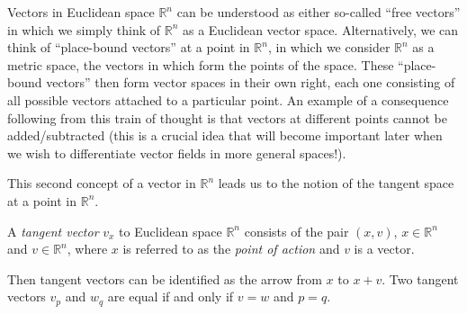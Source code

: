 \noindent Vectors in Euclidean space $\mathbb{R}^n$ can be understood as either so-called ``free vectors'' in which we simply think of $\mathbb{R}^n$ as a Euclidean vector space. Alternatively, we can think of ``place-bound vectors'' at a point in $\mathbb{R}^n$, in which we consider $\mathbb{R}^n$ as a metric space, the vectors in which form the points of the space. These ``place-bound vectors'' then form vector spaces in their own right, each one consisting of all possible vectors attached to a particular point. An example of a consequence following from this train of thought is that vectors at different points cannot be added/subtracted (this is a crucial idea that will become important later when we wish to differentiate vector fields in more general spaces!).

This second concept of a vector in $\mathbb{R}^n$ leads us to the notion of the tangent space at a point in $\mathbb{R}^n$.
\begin{definition}
A \textit{tangent vector} $v_x$ to Euclidean space $\mathbb{R}^n$ consists of the pair $(x,v)$, $x\in\mathbb{R}^n$ and $v\in\mathbb{R}^n$, where $x$ is referred to as the \textit{point of action} and $v$ is a vector.
\end{definition}
Then tangent vectors can be identified as the arrow from $x$ to $x+v$. Two tangent vectors $v_p$ and $w_q$ are equal if and only if $v=w$ and $p=q$.

